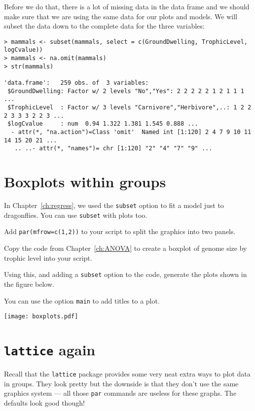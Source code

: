 Before we do that, there is a lot of missing data in the data frame and 
we should make sure that we are using the same data for our plots and 
models. We will subset the data down to the complete data for the three 
variables:

\begin{lstlisting}
> mammals <- subset(mammals, select = c(GroundDwelling, TrophicLevel, 
logCvalue))
> mammals <- na.omit(mammals)
> str(mammals)

'data.frame':	259 obs. of  3 variables:
 $GroundDwelling: Factor w/ 2 levels "No","Yes": 2 2 2 2 2 1 2 1 1 1 ...
 $TrophicLevel  : Factor w/ 3 levels "Carnivore","Herbivore",..: 1 2 2 2 3 3 3 2 2 3 ...
 $logCvalue     : num  0.94 1.322 1.381 1.545 0.888 ...
  - attr(*, "na.action")=Class 'omit'  Named int [1:120] 2 4 7 9 10 11 14 15 20 21 ...
   .. ..- attr(*, "names")= chr [1:120] "2" "4" "7" "9" ...
\end{lstlisting}

\section{Boxplots within groups}

In Chapter~\ref{ch:regress}, we used the {\tt subset} option to fit a model just to 
dragonflies. You can use {\tt subset} with plots too.

\begin{compactitem}[$\quad\star$]
	\item Add {\tt par(mfrow=c(1,2))} to your script to split the 
	graphics into two panels.
	\item Copy the code from Chapter~\ref{ch:ANOVA} to create a boxplot 
	of genome size by trophic level into your script.
	\item Using this, and adding a {\tt subset} option to the code, 
	generate the plots shown in the figure below.
	\item You can use the option {\tt main} to add titles to a plot.
\end{compactitem}

\begin{center}
	\texttt{[image: boxplots.pdf]}
\end{center} 

\section{{\tt lattice} again}

Recall that the {\tt lattice} package provides some very neat extra 
ways to plot data in groups. They look pretty but the downside is that 
they don't use the same graphics system --- all those {\tt par} 
commands are useless for these graphs. The defaults look good though!

